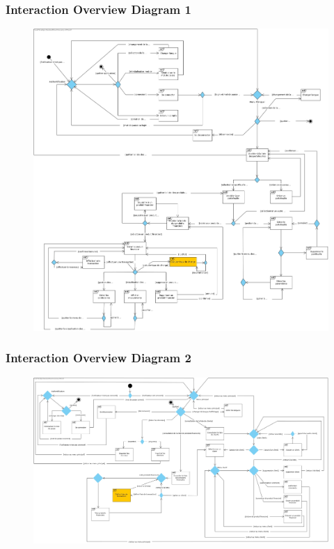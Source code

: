 \documentclass[../rapport.tex]{subfiles}
\begin{document}
\subsubsection{Interaction Overview Diagram 1}
\begin{figure}[H]
    \includegraphics[scale=0.24]{ressources/photos_diagrammes/extensionUgo/interactionOverviewDiagramApp1.jpg}
\end{figure}

\subsubsection{Interaction Overview Diagram 2}
\begin{figure}[H]
    \includegraphics[scale=0.188]{ressources/photos_diagrammes/extensionUgo/interactionOverviewDiagramApp2.jpg}
\end{figure}

\newpage
\end{document}
